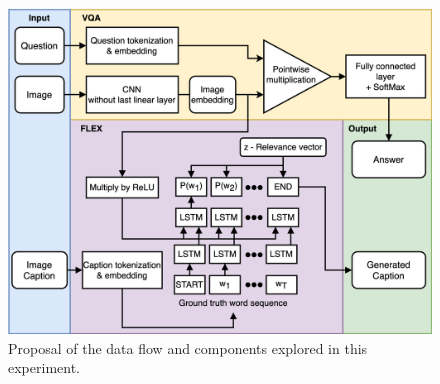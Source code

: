        
        \begin{figure}[htb]
            \centering
            
            \includegraphics[width=\linewidth]{images/flex_architecture_proposal.png}
            \caption{Proposal of the data flow and components explored in this experiment.
            }
            \label{fig:flex_architecture_proposal}
        \end{figure}
                
                
        

        
        
